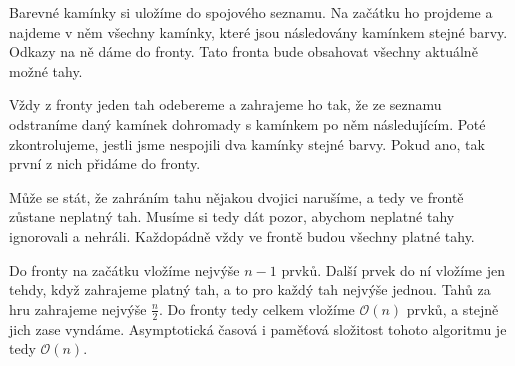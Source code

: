 \documentclass{article}
\begin{document}
Barevné kamínky si uložíme do spojového seznamu. Na začátku ho projdeme a najdeme v něm všechny kamínky, které jsou následovány kamínkem stejné barvy. Odkazy na ně dáme do fronty. Tato fronta bude obsahovat všechny aktuálně možné tahy.

Vždy z fronty jeden tah odebereme a zahrajeme ho tak, že ze seznamu odstraníme daný kamínek dohromady s kamínkem po něm následujícím. Poté zkontrolujeme, jestli jsme nespojili dva kamínky stejné barvy. Pokud ano, tak první z nich přidáme do fronty.

Může se stát, že zahráním tahu nějakou dvojici narušíme, a tedy ve frontě zůstane neplatný tah. Musíme si tedy dát pozor, abychom neplatné tahy ignorovali a nehráli. Každopádně vždy ve frontě budou všechny platné tahy.

Do fronty na začátku vložíme nejvýše $n - 1$ prvků. Další prvek do ní vložíme jen tehdy, když zahrajeme platný tah, a to pro každý tah nejvýše jednou. Tahů za hru zahrajeme nejvýše $\frac{n}{2}$. Do fronty tedy celkem vložíme $\mathcal{O}\left(n\right)$ prvků, a stejně jich zase vyndáme. Asymptotická časová i paměťová složitost tohoto algoritmu je tedy $\mathcal{O}\left(n\right)$.
\end{document}
